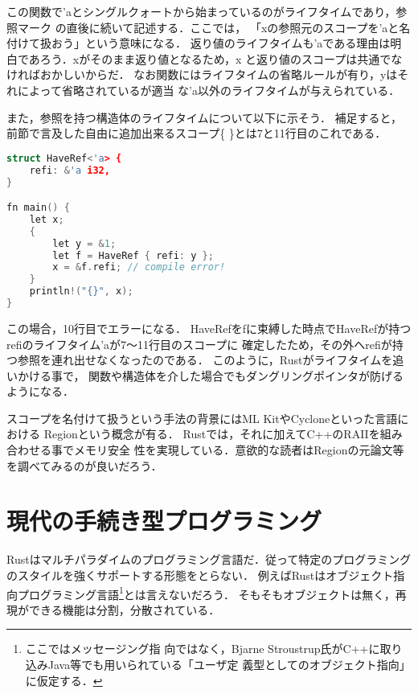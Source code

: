 この関数で'aとシングルクォートから始まっているのがライフタイムであり，参照マーク
の直後に続いて記述する．ここでは，
「xの参照元のスコープを'aと名付けて扱おう」という意味になる．
返り値のライフタイムも'aである理由は明白であろう．xがそのまま返り値となるため，x
と返り値のスコープは共通でなければおかしいからだ．
なお関数にはライフタイムの省略ルールが有り，yはそれによって省略されているが適当
な'a以外のライフタイムが与えられている．

また，参照を持つ構造体のライフタイムについて以下に示そう．
補足すると，前節で言及した自由に追加出来るスコープ\{ \}とは7と11行目のこれである．

\begin{lstlisting}[language={C++},caption=構造体のライフタイム,label=lifetime_st]
struct HaveRef<'a> {
    refi: &'a i32,
}

fn main() {
    let x;
    {
        let y = &1;
        let f = HaveRef { refi: y };
        x = &f.refi; // compile error!
    }
    println!("{}", x);
}
\end{lstlisting}

この場合，10行目でエラーになる．
HaveRefをfに束縛した時点でHaveRefが持つrefiのライフタイム'aが7〜11行目のスコープに
確定したため，その外へrefiが持つ参照を連れ出せなくなったのである．
このように，Rustがライフタイムを追いかける事で，
関数や構造体を介した場合でもダングリングポインタが防げるようになる．

スコープを名付けて扱うという手法の背景にはML KitやCycloneといった言語における
Regionという概念が有る．
Rustでは，それに加えてC++のRAIIを組み合わせる事でメモリ安全
性を実現している．意欲的な読者はRegionの元論文等を調べてみるのが良いだろう．

\section{現代の手続き型プログラミング}
Rustはマルチパラダイムのプログラミング言語だ．従って特定のプログラミングのスタイルを強くサポートする形態をとらない．
例えばRustはオブジェクト指向プログラミング言語\footnote{ここではメッセージング指
  向ではなく，Bjarne Stroustrup氏がC++に取り込みJava等でも用いられている「ユーザ定
  義型としてのオブジェクト指向」に仮定する．}とは言えないだろう．
そもそもオブジェクトは無く，再現ができる機能は分割，分散されている．

